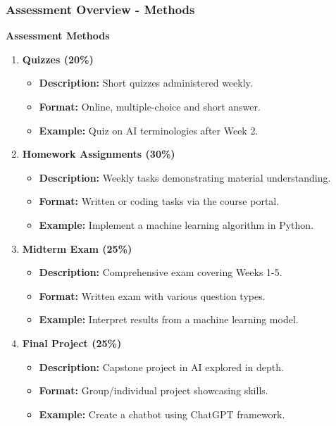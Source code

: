 \documentclass[aspectratio=169]{beamer}
\begin{document}
\begin{frame}[fragile]
    \frametitle{Assessment Overview - Methods}
    \textbf{Assessment Methods}
    \begin{enumerate}
        \item \textbf{Quizzes (20\%)}
        \begin{itemize}
            \item \textbf{Description:} Short quizzes administered weekly.
            \item \textbf{Format:} Online, multiple-choice and short answer.
            \item \textbf{Example:} Quiz on AI terminologies after Week 2.
        \end{itemize}
        
        \item \textbf{Homework Assignments (30\%)}
        \begin{itemize}
            \item \textbf{Description:} Weekly tasks demonstrating material understanding.
            \item \textbf{Format:} Written or coding tasks via the course portal.
            \item \textbf{Example:} Implement a machine learning algorithm in Python.
        \end{itemize}
        
        \item \textbf{Midterm Exam (25\%)}
        \begin{itemize}
            \item \textbf{Description:} Comprehensive exam covering Weeks 1-5.
            \item \textbf{Format:} Written exam with various question types.
            \item \textbf{Example:} Interpret results from a machine learning model.
        \end{itemize}
        
        \item \textbf{Final Project (25\%)}
        \begin{itemize}
            \item \textbf{Description:} Capstone project in AI explored in depth.
            \item \textbf{Format:} Group/individual project showcasing skills.
            \item \textbf{Example:} Create a chatbot using ChatGPT framework.
        \end{itemize}
    \end{enumerate}
\end{frame}
\end{document}
